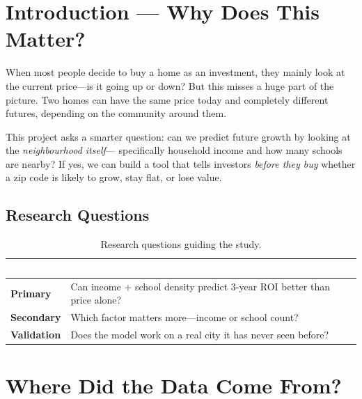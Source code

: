 \documentclass[12pt, a4paper]{article}
\begin{document}
\vspace{4pt}

\section{Introduction --- Why Does This Matter?}

When most people decide to buy a home as an investment, they mainly look at the current price---is it going up or
down? But this misses a huge part of the picture. Two homes can have the same price today and completely different
futures, depending on the community around them.

This project asks a smarter question: can we predict future growth by looking at the \textit{neighbourhood itself}---
specifically household income and how many schools are nearby? If yes, we can build a tool that tells investors
\textit{before they buy} whether a zip code is likely to grow, stay flat, or lose value.

\subsection*{Research Questions}

\begin{table}[H]
\centering
\renewcommand{\arraystretch}{1.4}
\begin{tabularx}{\linewidth}{>{\bfseries}p{2.2cm} X}
\toprule
\rowcolor{headerblue}\multicolumn{1}{c}{\textcolor{white}{\textbf{Type}}} &
    \multicolumn{1}{c}{\textcolor{white}{\textbf{Question}}} \\
\midrule
Primary   & Can income + school density predict 3-year ROI better than price alone? \\
Secondary & Which factor matters more---income or school count? \\
Validation & Does the model work on a real city it has never seen before? \\
\bottomrule
\end{tabularx}
\caption{Research questions guiding the study.}
\end{table}

\section{Where Did the Data Come From?}
\end{document}
